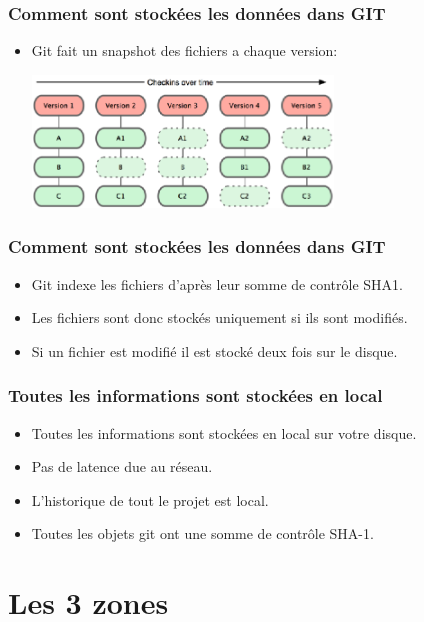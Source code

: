 \documentclass{beamer}
\begin{document}
   \begin{frame}
      \frametitle{Comment sont stockées les données dans GIT}
      \begin{itemize}
        \item Git fait un snapshot des fichiers a chaque version:
          \begin{center}
            \includegraphics[width=8cm]{imgs/snapshot.eps}
          \end{center}
      \end{itemize}
    \end{frame}

    \begin{frame}
      \frametitle{Comment sont stockées les données dans GIT}
      \begin{itemize}
      \item Git indexe les fichiers d'après leur somme de contrôle SHA1.
      \item Les fichiers sont donc stockés uniquement si ils sont modifiés.
      \item Si un fichier est modifié il est stocké deux fois sur le disque.
      \end{itemize}
    \end{frame}

   \begin{frame}
      \frametitle{Toutes les informations sont stockées en local}
      \begin{itemize}
        \item Toutes les informations sont stockées en local sur votre disque.
        \item Pas de latence due au réseau.
        \item L'historique de tout le projet est local.
        \item Toutes les objets git ont une somme de contrôle SHA-1.
      \end{itemize}
    \end{frame}
   \section{Les 3 zones}
\end{document}
